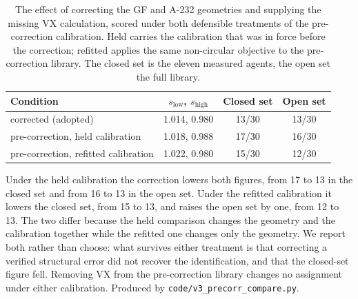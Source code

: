 \begin{table}[htbp]
\centering
\caption{The effect of correcting the GF and A-232 geometries and supplying the missing VX calculation, scored under both defensible treatments of the pre-correction calibration. Held carries the calibration that was in force before the correction; refitted applies the same non-circular objective to the pre-correction library. The closed set is the eleven measured agents, the open set the full library.}
\label{tab:si-precorr}
\small
\begin{tabular}{lccc}
\toprule
Condition & $s_\mathrm{low}$, $s_\mathrm{high}$ & Closed set & Open set \\
\midrule
corrected (adopted) & 1.014, 0.980 & 13/30 & 13/30 \\
pre-correction, held calibration & 1.018, 0.988 & 17/30 & 16/30 \\
pre-correction, refitted calibration & 1.022, 0.980 & 15/30 & 12/30 \\
\bottomrule
\end{tabular}

\begin{flushleft}\footnotesize Under the held calibration the correction lowers both figures, from 17 to 13 in the closed set and from 16 to 13 in the open set. Under the refitted calibration it lowers the closed set, from 15 to 13, and raises the open set by one, from 12 to 13. The two differ because the held comparison changes the geometry and the calibration together while the refitted one changes only the geometry. We report both rather than choose: what survives either treatment is that correcting a verified structural error did not recover the identification, and that the closed-set figure fell. Removing VX from the pre-correction library changes no assignment under either calibration. Produced by \texttt{code/v3\_precorr\_compare.py}.\end{flushleft}
\end{table}
